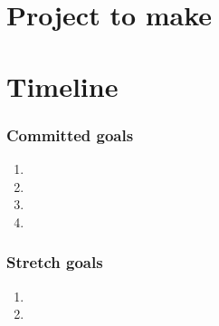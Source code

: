 \section{Project to make}

\section{Timeline}
\subsubsection{Committed goals}
\begin{enumerate}
    \item 
    \item 
    \item 
    \item 
\end{enumerate}

\subsubsection{Stretch goals}
\begin{enumerate}
    \item 
    \item 
\end{enumerate}